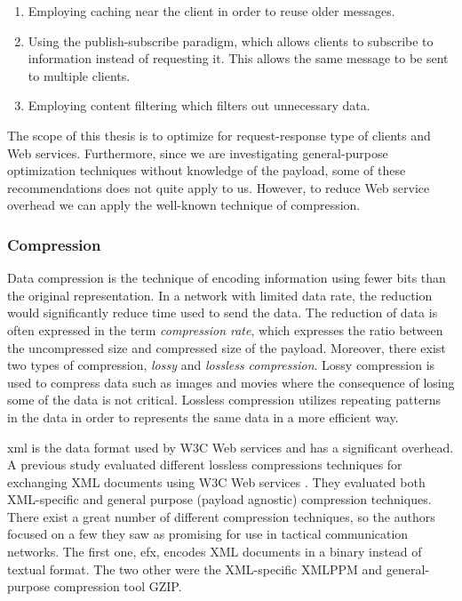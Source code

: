 \begin{enumerate}
    \item Employing caching near the client in order to reuse older messages.
    \item Using the publish-subscribe paradigm, which allows clients to subscribe to
    information instead of requesting it. This allows the same message to be sent
    to multiple clients.
    \item Employing content filtering which filters out unnecessary data.
\end{enumerate}

The scope of this thesis is to optimize for request-response type of clients and
Web services. Furthermore, since we are investigating general-purpose
optimization techniques without knowledge of the payload, some of these
recommendations does not quite apply to us. However, to reduce Web service
overhead we can apply the well-known technique of compression.

\subsubsection{Compression}

Data compression is the technique of encoding information using fewer bits than
the original representation. In a network with limited data rate, the reduction
would significantly reduce time used to send the data. The reduction of data is
often expressed in the term \textit{compression rate}, which expresses the ratio
between the uncompressed size and compressed size of the payload.  Moreover,
there exist two types of compression, \textit{lossy} and \textit{lossless
compression}. Lossy compression is used to compress data such as images and
movies where the consequence of losing some of the data is not critical.
Lossless compression utilizes repeating patterns in the data in order to
represents the same data in a more efficient way.

\gls{xml} is the data format used by W3C Web services and has a significant
overhead. A previous study evaluated different lossless compressions techniques
for exchanging XML documents using W3C Web services \cite{johnsen-compression}.
They evaluated both XML-specific and general purpose (payload agnostic)
compression techniques. There exist a great number of different compression
techniques, so the authors focused on a few they saw as promising for use in
tactical communication networks. The first one, \gls{efx}, encodes XML documents
in a binary instead of textual format. The two other were the XML-specific XMLPPM
and general-purpose compression tool GZIP.

